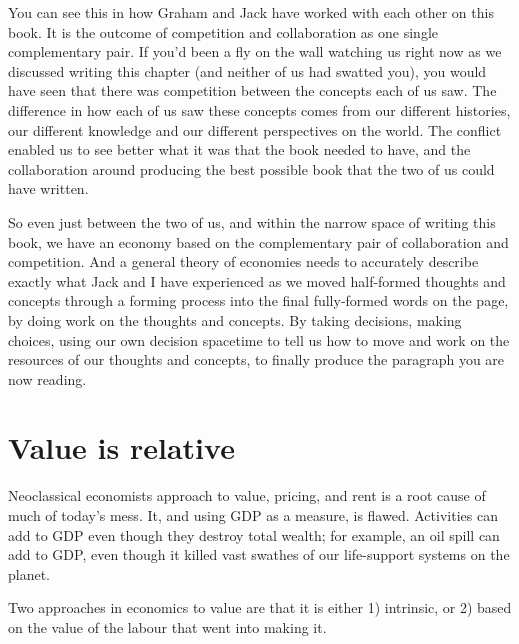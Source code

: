 \begin{longstoryblock}
You can see this in how Graham and Jack have worked with each other on this book. It is the outcome of competition and collaboration as one single complementary pair. If you'd been a fly on the wall watching us right now as we discussed writing this chapter (and neither of us had swatted you), you would have seen that there was competition between the concepts each of us saw. The difference in how each of us saw these concepts comes from our different histories, our different knowledge and our different perspectives on the world. The conflict enabled us to see better what it was that the book needed to have, and the collaboration around producing the best possible book that the two of us could have written. 


So even just between the two of us, and within the narrow space of writing this book, we have an economy based on the complementary pair of collaboration and competition. And a general theory of economies needs to accurately describe exactly what Jack and I have experienced as we moved half-formed thoughts and concepts through a forming process into the final fully-formed words on the page, by doing work on the thoughts and concepts. By taking decisions, making choices, using our own decision spacetime to tell us how to move and work on the resources of our thoughts and concepts, to finally produce the paragraph you are now reading. 
\end{longstoryblock}






\section{Value is relative}


Neoclassical economists approach to value, pricing, and rent is a root cause of much of today’s mess\cite{mazzucato-value-everything}.  It, and using GDP as a measure, is flawed. Activities can add to GDP even though they destroy total wealth; for example, an oil spill can add to GDP, even though it killed vast swathes of our life-support systems on the planet. 


Two approaches in economics to value are that it is either 1) intrinsic, or 2) based on the value of the labour that went into making it. 


